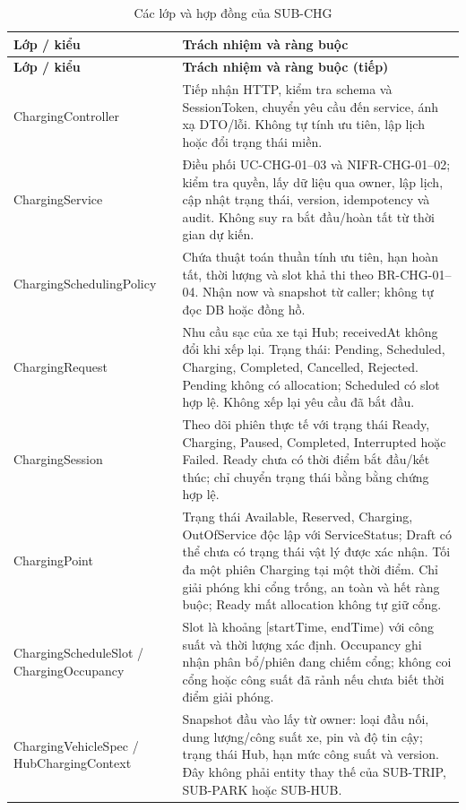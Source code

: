 \begin{longtable}{|L{37mm}|L{102mm}|}
\caption{Các lớp và hợp đồng của SUB-CHG}\\\hline
\textbf{Lớp / kiểu} & \textbf{Trách nhiệm và ràng buộc}\\\hline
\endfirsthead
\hline\textbf{Lớp / kiểu} & \textbf{Trách nhiệm và ràng buộc (tiếp)}\\\hline\endhead
Charging\allowbreak Controller & Tiếp nhận HTTP, kiểm tra schema và SessionToken, chuyển yêu cầu đến service, ánh xạ DTO/lỗi. Không tự tính ưu tiên, lập lịch hoặc đổi trạng thái miền.\\\hline
ChargingService & Điều phối UC-CHG-01--03 và NIFR-CHG-01--02; kiểm tra quyền, lấy dữ liệu qua owner, lập lịch, cập nhật trạng thái, version, idempotency và audit. Không suy ra bắt đầu/hoàn tất từ thời gian dự kiến.\\\hline
Charging\allowbreak Scheduling\allowbreak Policy & Chứa thuật toán thuần tính ưu tiên, hạn hoàn tất, thời lượng và slot khả thi theo BR-CHG-01--04. Nhận now và snapshot từ caller; không tự đọc DB hoặc đồng hồ.\\\hline
ChargingRequest & Nhu cầu sạc của xe tại Hub; receivedAt không đổi khi xếp lại. Trạng thái: Pending, Scheduled, Charging, Completed, Cancelled, Rejected. Pending không có allocation; Scheduled có slot hợp lệ. Không xếp lại yêu cầu đã bắt đầu.\\\hline
ChargingSession & Theo dõi phiên thực tế với trạng thái Ready, Charging, Paused, Completed, Interrupted hoặc Failed. Ready chưa có thời điểm bắt đầu/kết thúc; chỉ chuyển trạng thái bằng bằng chứng hợp lệ.\\\hline
ChargingPoint & Trạng thái Available, Reserved, Charging, OutOfService độc lập với ServiceStatus; Draft có thể chưa có trạng thái vật lý được xác nhận. Tối đa một phiên Charging tại một thời điểm. Chỉ giải phóng khi cổng trống, an toàn và hết ràng buộc; Ready mất allocation không tự giữ cổng.\\\hline
Charging\allowbreak Schedule\allowbreak Slot / ChargingOccupancy & Slot là khoảng [startTime, endTime) với công suất và thời lượng xác định. Occupancy ghi nhận phân bổ/phiên đang chiếm cổng; không coi cổng hoặc công suất đã rảnh nếu chưa biết thời điểm giải phóng.\\\hline
Charging\allowbreak Vehicle\allowbreak Spec / Hub\allowbreak Charging\allowbreak Context & Snapshot đầu vào lấy từ owner: loại đầu nối, dung lượng/công suất xe, pin và độ tin cậy; trạng thái Hub, hạn mức công suất và version. Đây không phải entity thay thế của SUB-TRIP, SUB-PARK hoặc SUB-HUB.\\\hline

\end{longtable}

